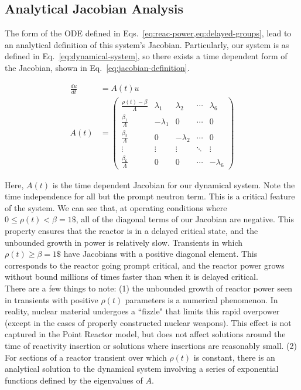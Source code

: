 \documentclass[review,onefignum,onetabnum]{siamart171218}
\begin{document}
\subsection{Analytical Jacobian Analysis}
The form of the ODE defined in Eqs.~\cref{eq:reac-power,eq:delayed-groups},
lead to an analytical definition of this system's Jacobian.\cite{Ganopol_accurate}
Particularly, our system is as defined in Eq.~\cref{eq:dynamical-system}, so
there exists a time dependent form of the Jacobian, shown in Eq.~\cref{eq:jacobian-definition}.

\begin{align}
  \label{eq:dynamical-system}
  \frac{du}{dt} &= A(t)u\\
  \label{eq:jacobian-definition}
  A(t) &= \begin{pmatrix}\frac{\rho(t)-\beta}{\Lambda}&\lambda_1&\lambda_2&\cdots&\lambda_6\\
                      \frac{\beta_1}{\Lambda}&-\lambda_1&0&\cdots&0\\
                      \frac{\beta_2}{\Lambda}&0&-\lambda_2&\cdots&0\\
                      \vdots&\vdots&\vdots&\ddots&\vdots\\
                      \frac{\beta_6}{\Lambda}&0&0&\cdots&-\lambda_6\end{pmatrix}
\end{align}

Here, $A(t)$ is the time dependent Jacobian for our dynamical system. Note the
time independence for all but the prompt neutron term. This is a critical feature
of the system. We can see that, at operating conditions where $0 \leq \rho(t) < \beta = 1\$$,
all of the diagonal terms of our Jacobian are negative. This property ensures
that the reactor is in a delayed critical state, and the unbounded growth in power
is relatively slow. Transients in which $\rho(t) \geq \beta = 1\$$ have Jacobians with
a positive diagonal element. This corresponds to the reactor going prompt critical, and
the reactor power grows without bound millions of times faster than when it is delayed
critical. \\

There are a few things to note: (1) the unbounded growth of reactor power seen
in transients with positive $\rho(t)$ parameters is a numerical phenomenon. In reality,
nuclear material undergoes a ``fizzle" that limits this rapid overpower (except
in the cases of properly constructed nuclear weapons). This effect is not captured in the Point Reactor
model, but does not affect solutions around the time of reactivity insertion or solutions
where insertions are reasonably small. (2) For
sections of a reactor transient over which $\rho(t)$ is constant, there is an
analytical solution to the dynamical system involving a series of exponential functions
defined by the eigenvalues of $A$. \\
\end{document}
